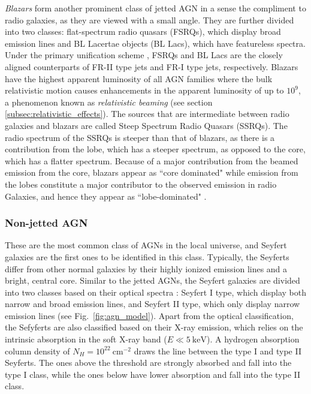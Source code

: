 \textit{Blazars} form another prominent class of jetted AGN in a sense the compliment to radio galaxies, as they are viewed with a small angle. They are further divided into two classes: flat-spectrum radio quasars (FSRQs), which display broad emission lines and BL Lacertae objects (BL Lacs), which have featureless spectra. Under the primary unification scheme 
\citep[e.g.,][]{urry1995unified}, FSRQs and BL Lacs are the closely aligned counterparts of FR-II type jets and FR-I type jets, respectively. Blazars have the highest apparent luminosity of all AGN families where the bulk relativistic motion causes enhancements in the apparent luminosity of up to $10^9$, a phenomenon known as \textit{relativistic beaming} (see section \ref{subsec:relativistic_effects}). The sources that are intermediate between radio galaxies and blazars are called Steep Spectrum Radio Quasars (SSRQs). The radio spectrum of the SSRQs is steeper than that of blazars, as there is a contribution from the lobe, which has a steeper spectrum, as opposed to the core, which has a flatter spectrum. Because of a major contribution from the beamed emission from the core, blazars appear as ``core dominated" while emission from the lobes constitute a major contributor to the observed emission in radio Galaxies, and hence they appear as ``lobe-dominated" \citep{1997iagn.book.....P}.



\subsubsection{Non-jetted AGN}
These are the most common class of AGNs in the local universe, and Seyfert galaxies \citep{seyfert1943nuclear} are the first ones to be identified in this class. Typically, the Seyferts differ from other normal galaxies by their highly ionized emission lines and a bright, central core. Similar to the jetted AGNs, the Seyfert galaxies are divided into two classes based on their optical spectra \citep{khachikian1974atlas}: Seyfert I type, which display both narrow and broad emission lines, and Seyfert II type, which only display narrow emission lines (see Fig.~\ref{fig:agn_model}). Apart from the optical classification, the Sefyferts are also classified based on their X-ray emission, which relies on the intrinsic absorption in the soft X-ray band ($E\ll 5~\textrm{keV}$). A hydrogen absorption column density of $N_H=10^{22}~\textrm{cm}^{-2}$ draws the line between the type I and type II Seyferts. The ones above the threshold are strongly absorbed and fall into the type I class, while the ones below have lower absorption and fall into the type II class. 

